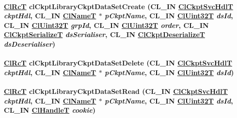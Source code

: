 \hypertarget{group__group10_ga6}{
\paragraph[clCkptLibraryCkptDataSetCreate]{\setlength{\rightskip}{0pt plus 5cm}\hyperlink{group__group2_ga18}{Cl\-Rc\-T} cl\-Ckpt\-Library\-Ckpt\-Data\-Set\-Create (CL\_\-IN \hyperlink{cl_ckpt_api_8h_a12}{Cl\-Ckpt\-Svc\-Hdl\-T} {\em ckpt\-Hdl}, CL\_\-IN \hyperlink{struct_cl_name_t}{Cl\-Name\-T} $\ast$ {\em p\-Ckpt\-Name}, CL\_\-IN \hyperlink{group__group2_ga1}{Cl\-Uint32T} {\em ds\-Id}, CL\_\-IN \hyperlink{group__group2_ga1}{Cl\-Uint32T} {\em grp\-Id}, CL\_\-IN \hyperlink{group__group2_ga1}{Cl\-Uint32T} {\em order}, CL\_\-IN \hyperlink{group__group10_ga0}{Cl\-Ckpt\-Serialize\-T} {\em ds\-Serialiser}, CL\_\-IN \hyperlink{group__group10_ga1}{Cl\-Ckpt\-Deserialize\-T} {\em ds\-Deserialiser})}\hfill}
\label{group__group10_ga6}


\hypertarget{group__group10_ga7}{
\paragraph[clCkptLibraryCkptDataSetDelete]{\setlength{\rightskip}{0pt plus 5cm}\hyperlink{group__group2_ga18}{Cl\-Rc\-T} cl\-Ckpt\-Library\-Ckpt\-Data\-Set\-Delete (CL\_\-IN \hyperlink{cl_ckpt_api_8h_a12}{Cl\-Ckpt\-Svc\-Hdl\-T} {\em ckpt\-Hdl}, CL\_\-IN \hyperlink{struct_cl_name_t}{Cl\-Name\-T} $\ast$ {\em p\-Ckpt\-Name}, CL\_\-IN \hyperlink{group__group2_ga1}{Cl\-Uint32T} {\em ds\-Id})}\hfill}
\label{group__group10_ga7}


\hypertarget{group__group10_ga9}{
\paragraph[clCkptLibraryCkptDataSetRead]{\setlength{\rightskip}{0pt plus 5cm}\hyperlink{group__group2_ga18}{Cl\-Rc\-T} cl\-Ckpt\-Library\-Ckpt\-Data\-Set\-Read (CL\_\-IN \hyperlink{cl_ckpt_api_8h_a12}{Cl\-Ckpt\-Svc\-Hdl\-T} {\em ckpt\-Hdl}, CL\_\-IN \hyperlink{struct_cl_name_t}{Cl\-Name\-T} $\ast$ {\em p\-Ckpt\-Name}, CL\_\-IN \hyperlink{group__group2_ga1}{Cl\-Uint32T} {\em ds\-Id}, CL\_\-IN \hyperlink{group__group2_ga10}{Cl\-Handle\-T} {\em cookie})}\hfill}
\label{group__group10_ga9}


